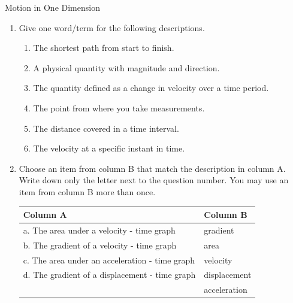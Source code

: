 \begin{eocexercises}{Motion in One Dimension}
            \nopagebreak \noindent
      \label{m38796*id81294}\begin{enumerate}[noitemsep, label=\textbf{\arabic*}. ] 
            \label{m38796*uid172}\item Give one word/term for the following descriptions.
\label{m38796*id81309}\begin{enumerate}[noitemsep, label=\textbf{\alph*}. ] 
            \label{m38796*uid173}\item The shortest path from start to finish.
\label{m38796*uid174}\item A physical quantity with magnitude and direction.
\label{m38796*uid175}\item The quantity defined as a change in velocity over a time period.
\label{m38796*uid176}\item The point from where you take measurements.
\label{m38796*uid177}\item The distance covered in a time interval.
\label{m38796*uid178}\item The velocity at a specific instant in time.
\end{enumerate}
                \label{m38796*uid179}\item Choose an item from column B that match the description in column A. Write down only the letter next to the question number. You may use an item from column B more than once.
          \begin{table}[H]
        \begin{center}
      \label{m38796*uid180}
    \noindent
      \begin{tabular}{|l|l|}\hline
        Column A &
        Column B \\ \hline
        a. The area under a velocity - time graph &
        gradient \\ \hline
        b. The gradient of a velocity - time graph &
        area \\ \hline
        c. The area under an acceleration - time graph &
        velocity \\ \hline
        d. The gradient of a displacement - time graph &
        displacement \\ \hline
         &
        acceleration \\ \hline

\end{tabular}
\end{center}
\end{table}
\end{enumerate}
\end{eocexercises}

